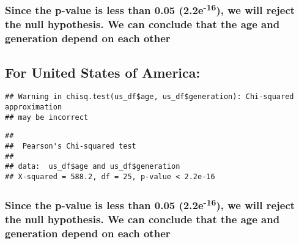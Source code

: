 \documentclass[
]{article}
\newenvironment{Shaded}{\begin{snugshade}}{\end{snugshade}}
\newcommand{\FunctionTok}[1]{\textcolor[rgb]{0.00,0.00,0.00}{#1}}
\newcommand{\NormalTok}[1]{#1}
\newcommand{\SpecialCharTok}[1]{\textcolor[rgb]{0.00,0.00,0.00}{#1}}
\begin{document}
\hypertarget{since-the-p-value-is-less-than-0.05-2.2e-16-we-will-reject-the-null-hypothesis.-we-can-conclude-that-the-age-and-generation-depend-on-each-other-6}{%
\subsubsection{\texorpdfstring{Since the p-value is less than 0.05
(2.2e\textsuperscript{-16}), we will reject the null hypothesis. We can
conclude that the age and generation depend on each
other}{Since the p-value is less than 0.05 (2.2e-16), we will reject the null hypothesis. We can conclude that the age and generation depend on each other}}\label{since-the-p-value-is-less-than-0.05-2.2e-16-we-will-reject-the-null-hypothesis.-we-can-conclude-that-the-age-and-generation-depend-on-each-other-6}}

\hypertarget{for-united-states-of-america-1}{%
\subsection{For United States of
America:}\label{for-united-states-of-america-1}}

\begin{Shaded}
\end{Shaded}

\begin{verbatim}
## Warning in chisq.test(us_df$age, us_df$generation): Chi-squared approximation
## may be incorrect
\end{verbatim}

\begin{verbatim}
## 
##  Pearson's Chi-squared test
## 
## data:  us_df$age and us_df$generation
## X-squared = 588.2, df = 25, p-value < 2.2e-16
\end{verbatim}

\hypertarget{since-the-p-value-is-less-than-0.05-2.2e-16-we-will-reject-the-null-hypothesis.-we-can-conclude-that-the-age-and-generation-depend-on-each-other-7}{%
\subsubsection{\texorpdfstring{Since the p-value is less than 0.05
(2.2e\textsuperscript{-16}), we will reject the null hypothesis. We can
conclude that the age and generation depend on each
other}{Since the p-value is less than 0.05 (2.2e-16), we will reject the null hypothesis. We can conclude that the age and generation depend on each other}}\label{since-the-p-value-is-less-than-0.05-2.2e-16-we-will-reject-the-null-hypothesis.-we-can-conclude-that-the-age-and-generation-depend-on-each-other-7}}
\end{document}
